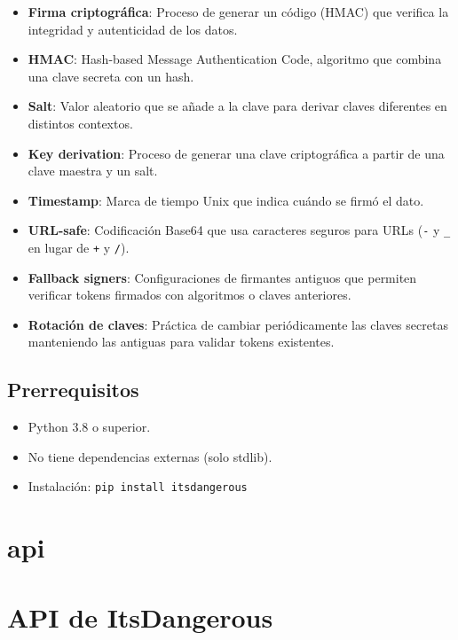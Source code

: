 \documentclass[11pt,a4paper]{article}
\begin{document}
\begin{itemize}[leftmargin=*,topsep=2pt,itemsep=1pt]
  \item \textbf{Firma criptográfica}: Proceso de generar un código (HMAC) que verifica la integridad y autenticidad de los datos.
  \item \textbf{HMAC}: Hash-based Message Authentication Code, algoritmo que combina una clave secreta con un hash.
  \item \textbf{Salt}: Valor aleatorio que se añade a la clave para derivar claves diferentes en distintos contextos.
  \item \textbf{Key derivation}: Proceso de generar una clave criptográfica a partir de una clave maestra y un salt.
  \item \textbf{Timestamp}: Marca de tiempo Unix que indica cuándo se firmó el dato.
  \item \textbf{URL-safe}: Codificación Base64 que usa caracteres seguros para URLs (\texttt{-} y \texttt{\_} en lugar de \texttt{+} y \texttt{/}).
  \item \textbf{Fallback signers}: Configuraciones de firmantes antiguos que permiten verificar tokens firmados con algoritmos o claves anteriores.
  \item \textbf{Rotación de claves}: Práctica de cambiar periódicamente las claves secretas manteniendo las antiguas para validar tokens existentes.
\end{itemize}


\subsection*{Prerrequisitos}


\begin{itemize}[leftmargin=*,topsep=2pt,itemsep=1pt]
  \item Python 3.8 o superior.
  \item No tiene dependencias externas (solo stdlib).
  \item Instalación: \texttt{pip install itsdangerous}
\end{itemize}


\section*{api}

\section*{API de ItsDangerous}
\end{document}
